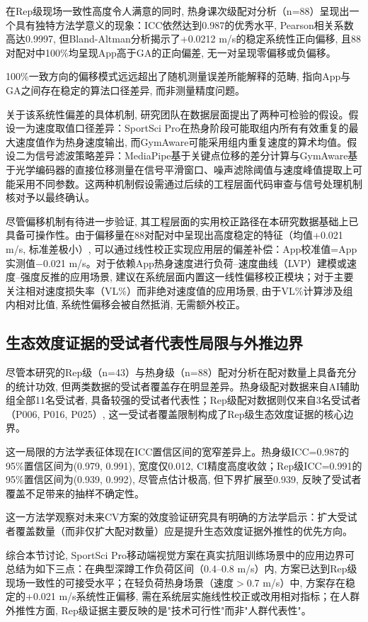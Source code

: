 在Rep级现场一致性高度令人满意的同时, 热身课次级配对分析（n=88）呈现出一个具有独特方法学意义的现象：ICC依然达到0.987的优秀水平, Pearson相关系数高达0.9997, 但Bland-Altman分析揭示了+0.0212 m/s的稳定系统性正向偏移, 且88对配对中100\%均呈现App高于GA的正向偏差, 无一对呈现零偏移或负偏移。

100\%一致方向的偏移模式远远超出了随机测量误差所能解释的范畴, 指向App与GA之间存在稳定的算法口径差异, 而非测量精度问题。

关于该系统性偏差的具体机制, 研究团队在数据层面提出了两种可检验的假设。假设一为速度取值口径差异：SportSci Pro在热身阶段可能取组内所有有效重复的最大速度值作为热身速度输出, 而GymAware可能采用组内重复速度的算术均值。假设二为信号滤波策略差异：MediaPipe基于关键点位移的差分计算与GymAware基于光学编码器的直接位移测量在信号平滑窗口、噪声滤除阈值与速度峰值提取上可能采用不同参数。这两种机制假设需通过后续的工程层面代码审查与信号处理机制核对予以最终确认。

尽管偏移机制有待进一步验证, 其工程层面的实用校正路径在本研究数据基础上已具备可操作性。由于偏移量在88对配对中呈现出高度稳定的特征（均值+0.021 m/s, 标准差极小）, 可以通过线性校正实现应用层的偏差补偿：App校准值=App实测值$-$0.021 m/s。对于依赖App热身速度进行负荷--速度曲线（LVP）建模或速度--强度反推的应用场景, 建议在系统层面内置这一线性偏移校正模块；对于主要关注相对速度损失率（VL\%）而非绝对速度值的应用场景, 由于VL\%计算涉及组内相对比值, 系统性偏移会被自然抵消, 无需额外校正。

\subsection{生态效度证据的受试者代表性局限与外推边界}
\label{sec:ecological_limitations}

尽管本研究的Rep级（n=43）与热身级（n=88）配对分析在配对数量上具备充分的统计功效, 但两类数据的受试者覆盖存在明显差异。热身级配对数据来自AI辅助组全部11名受试者, 具备较强的受试者代表性；Rep级配对数据则仅来自3名受试者（P006, P016, P025）, 这一受试者覆盖限制构成了Rep级生态效度证据的核心边界。

这一局限的方法学表征体现在ICC置信区间的宽窄差异上。热身级ICC=0.987的95\%置信区间为(0.979, 0.991), 宽度仅0.012, CI精度高度收敛；Rep级ICC=0.991的95\%置信区间为(0.939, 0.992), 尽管点估计极高, 但下界扩展至0.939, 反映了受试者覆盖不足带来的抽样不确定性。

这一方法学观察对未来CV方案的效度验证研究具有明确的方法学启示：扩大受试者覆盖数量（而非仅扩大配对数量）应是提升生态效度证据外推性的优先方向。

综合本节讨论, SportSci Pro移动端视觉方案在真实抗阻训练场景中的应用边界可总结为如下三点：在典型深蹲工作负荷区间（0.4--0.8 m/s）内, 方案已达到Rep级现场一致性的可接受水平；在轻负荷热身场景（速度$>$0.7 m/s）中, 方案存在稳定的+0.021 m/s系统性正偏移, 需在系统层实施线性校正或改用相对指标；在人群外推性方面, Rep级证据主要反映的是"技术可行性"而非"人群代表性"。

